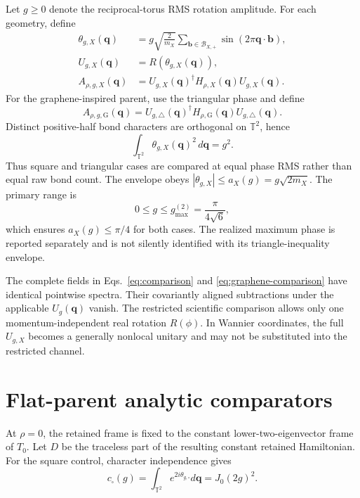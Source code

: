 \documentclass[11pt]{article}
\newcommand{\T}{\mathbb T}
\begin{document}
Let $g\ge0$ denote the reciprocal-torus RMS rotation amplitude.  For each geometry,
define
\begin{align}
 \theta_{g,X}(\mathbf q)
 &=g\sqrt{\frac{2}{m_X}}
   \sum_{\mathbf b\in\mathcal B_{X,+}}
   \sin(2\pi\mathbf q\cdot\mathbf b),
 \label{eq:rms-phase}\\
 U_{g,X}(\mathbf q)&=R(\theta_{g,X}(\mathbf q)),\\
 A_{\rho,g,X}(\mathbf q)
 &=U_{g,X}(\mathbf q)^\dagger
   H_{\rho,X}(\mathbf q)U_{g,X}(\mathbf q).
 \label{eq:comparison}
\end{align}
For the graphene-inspired parent, use the triangular phase and define
\begin{equation}
 A_{\rho,g,\mathrm G}(\mathbf q)
 =U_{g,\triangle}(\mathbf q)^\dagger
  H_{\rho,\mathrm G}(\mathbf q)U_{g,\triangle}(\mathbf q).
 \label{eq:graphene-comparison}
\end{equation}
Distinct positive-half bond characters are orthogonal on $\T^2$, hence
\begin{equation}
 \int_{\T^2}\theta_{g,X}(\mathbf q)^2\,d\mathbf q=g^2.
\end{equation}
Thus square and triangular cases are compared at equal phase RMS rather than equal raw
bond count.  The envelope obeys
$|\theta_{g,X}|\le a_X(g)=g\sqrt{2m_X}$.  The primary range is
\begin{equation}
 0\le g\le g_{\max}^{(2)}=\frac{\pi}{4\sqrt6},
 \label{eq:g-range}
\end{equation}
which ensures $a_X(g)\le\pi/4$ for both cases.  The realized maximum phase is reported
separately and is not silently identified with its triangle-inequality envelope.

The complete fields in Eqs.~\eqref{eq:comparison} and
\eqref{eq:graphene-comparison} have identical pointwise spectra.  Their covariantly
aligned subtractions under the applicable $U_g(\mathbf q)$ vanish.  The restricted
scientific comparison allows only one momentum-independent real rotation $R(\phi)$.
In Wannier coordinates, the full $U_{g,X}$ becomes a generally nonlocal unitary and may
not be substituted into the restricted channel.

\section{Flat-parent analytic comparators}

At $\rho=0$, the retained frame is fixed to the constant lower-two-eigenvector frame of
$T_0$.  Let $D$ be the traceless part of the resulting constant retained Hamiltonian.
For the square control, character independence gives
\begin{equation}
 c_{\square}(g)
 =\int_{\T^2}e^{2i\theta_{g,\square}}d\mathbf q
 =J_0(2g)^2.
 \label{eq:square-comparator}
\end{equation}
\end{document}
